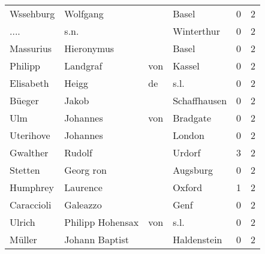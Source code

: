 \begin{center}
\begin{tiny}
\begin{longtabu}{llllrr}
                Wssehburg &                           Wolfgang &             &                                       Basel &          0 &         2 \\
                     .... &                               s.n. &             &                                  Winterthur &          0 &         2 \\
                Massurius &                         Hieronymus &             &                                       Basel &          0 &         2 \\
                  Philipp &                           Landgraf &         von &                                      Kassel &          0 &         2 \\
                Elisabeth &                              Heigg &          de &                                        s.l. &          0 &         2 \\
                   Büeger &                              Jakob &             &                                Schaffhausen &          0 &         2 \\
                      Ulm &                           Johannes &         von &                                    Bradgate &          0 &         2 \\
                Uterihove &                           Johannes &             &                                      London &          0 &         2 \\
                 Gwalther &                             Rudolf &             &                                      Urdorf &          3 &         2 \\
                  Stetten &                          Georg ron &             &                                    Augsburg &          0 &         2 \\
                 Humphrey &                           Laurence &             &                                      Oxford &          1 &         2 \\
               Caraccioli &                           Galeazzo &             &                                        Genf &          0 &         2 \\
                   Ulrich &                  Philipp  Hohensax &         von &                                        s.l. &          0 &         2 \\
                   Müller &                     Johann Baptist &             &                                 Haldenstein &          0 &         2 \\

\end{longtabu}
\end{tiny}
\end{center}
